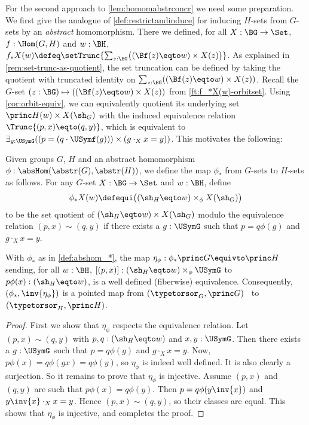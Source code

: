 \label{sec:absconctorsor}

For the second approach to \cref{lem:homomabstrconcr} we need
some preparation. We first give the analogue of
\cref{def:restrictandinduce} for inducing $H$-sets from
$G$-sets by an \emph{abstract} homomorphism. 
There we defined, for all $X:\BG\to\Set$, $f:\Hom(G,H)$ and $w:\BH$,
$f_*X(w)\defeq
\setTrunc{\sum_{z:\BG}\bigl((\Bf(z) \eqto w)\times X(z)\bigr)}$.
As explained in \cref{rem:set-trunc-as-quotient},
the set truncation can be defined by taking the quotient with
truncated identity on $\sum_{z:\BG}((\Bf(z) \eqto w)\times X(z))$.
Recall the $G$-set $(z:\BG)\mapsto((\Bf(z) \eqto w)\times X(z))$ 
from \cref{ft:f_*X(w)-orbitset}. Using \cref{cor:orbit-equiv},
we can equivalently quotient its underlying set 
$\princ H(w)\times X(\sh_G)$ with the induced equivalence 
relation $\Trunc{(p,x)\eqto(q,y)}$, 
which is equivalent to
$\exists_{g:\USymG}((p=(q\cdot\USymf(g)))\times(g\cdot_X x = y))$.
This motivates the following:

\begin{definition}\label{def:abshom_*}
  Given groups $G$, $H$ and an abstract homomorphism
  $\phi:\absHom(\abstr(G),\abstr(H))$, we define the map $\phi_*$
  from $G$-sets to $H$-sets as follows. 
  For any $G$-set $X:\BG\to\Set$ and $w:\BH$, define
  \[
    \phi_*X(w)\defequi \bigl((\sh_H \eqto w) \times_\phi X(\sh_G)\bigr)
  \]
  to be the set quotient of $(\sh_H\eqto w)\times X(\sh_G)$ modulo
  the equivalence relation $(p,x)\sim(q,y)$ if there exists a $g:\USymG$
  such that $p=q\phi(g)$ and $g\cdot_X x = y$.
\end{definition}

\begin{lemma}\label{lem:abshom_*}
  With $\phi_*$ as in \cref{def:abshom_*}, the map 
  $\eta_\phi:\phi_*\princ G \equivto \princ H$ sending, for all $w:\BH$,
  $[(p,x)]: (\sh_H \eqto w) \times_\phi \USymG$ to $p\phi(x):(\sh_H\eqto w)$,
  is a well defined (fiberwise) equivalence. Consequently,
  $(\phi_*,\inv{\eta_\phi})$ is a pointed map from
  $(\typetorsor_G,\princ G)$  to $(\typetorsor_H,\princ H)$.
\end{lemma}
\begin{proof}
First we show that $\eta_\phi$ respects the equivalence relation.
Let $(p,x)\sim(q,y)$ with $p,q:(\sh_H \eqto w)$ and $x,y:\USymG$.
Then there exists a $g:\USymG$ such that $p=q\phi(g)$ and $g\cdot_X x = y$.
Now, $p\phi(x)=q\phi(gx) = q\phi(y)$, so $\eta_\phi$
is indeed well defined.
It is also clearly a surjection. So it remains to prove that $\eta_\phi$
is injective. Assume $(p,x)$ and $(q,y)$ are such that
$p\phi(x) = q\phi(y)$. Then $p= q\phi(y\inv{x})$ and 
$y\inv{x}\cdot_X x = y$. 
Hence $(p,x)\sim(q,y)$, so their classes are equal.
This shows that $\eta_\phi$ is injective, and completes the proof.
\end{proof}

